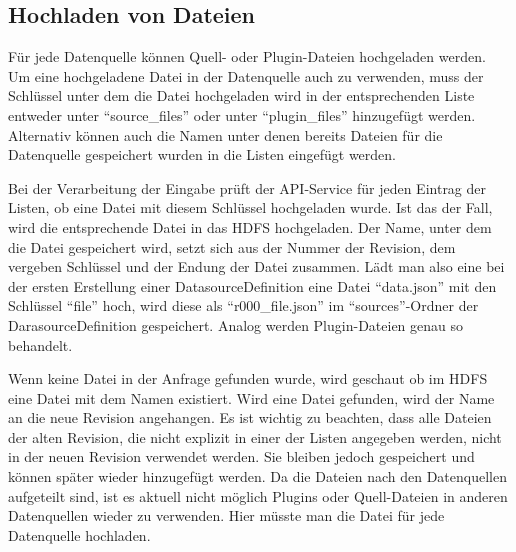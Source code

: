 \subsection{Hochladen von Dateien}

Für jede Datenquelle können Quell- oder Plugin-Dateien hochgeladen werden.
Um eine hochgeladene Datei in der Datenquelle auch zu verwenden, muss der Schlüssel unter dem die Datei hochgeladen wird in der entsprechenden Liste entweder unter "`source\_files"' oder unter "`plugin\_files"' hinzugefügt werden.
Alternativ können auch die Namen unter denen bereits Dateien für die Datenquelle gespeichert wurden in die Listen eingefügt werden.

Bei der Verarbeitung der Eingabe prüft der API-Service für jeden Eintrag der Listen, ob eine Datei mit diesem Schlüssel hochgeladen wurde.
Ist das der Fall, wird die entsprechende Datei in das HDFS hochgeladen.
Der Name, unter dem die Datei gespeichert wird, setzt sich aus der Nummer der Revision, dem vergeben Schlüssel und der Endung der Datei zusammen.
Lädt man also eine bei der ersten Erstellung einer DatasourceDefinition eine Datei "`data.json"' mit den Schlüssel "`file"' hoch, wird diese als "`r000\_file.json"' im "`sources"'-Ordner der DarasourceDefinition gespeichert.
Analog werden Plugin-Dateien genau so behandelt.

Wenn keine Datei in der Anfrage gefunden wurde, wird geschaut ob im HDFS eine Datei mit dem Namen existiert.
Wird eine Datei gefunden, wird der Name an die neue Revision angehangen.
Es ist wichtig zu beachten, dass alle Dateien der alten Revision, die nicht explizit in einer der Listen angegeben werden, nicht in der neuen Revision verwendet werden.
Sie bleiben jedoch gespeichert und können später wieder hinzugefügt werden.
Da die Dateien nach den Datenquellen aufgeteilt sind, ist es aktuell nicht möglich Plugins oder Quell-Dateien in anderen Datenquellen wieder zu verwenden.
Hier müsste man die Datei für jede Datenquelle hochladen.
